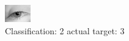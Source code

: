 \begin{figure}[h!]
\begin{center}
\includegraphics[width=0.60\columnwidth]{figures/ID2864_class_2_target_3.png}
\end{center}
\caption{ Classification: 2 actual target: 3}
\label{fig:ID2864_class_2_target_3}
\end{figure}
